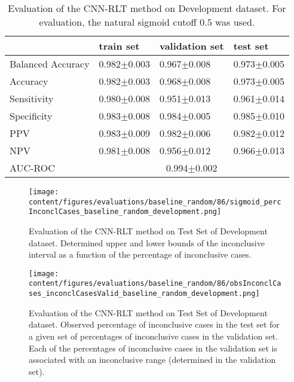 \begin{table}[ht]
  \caption{Evaluation of the CNN-RLT method on Development dataset. 
  For evaluation, the natural sigmoid cutoff $0.5$ was used.}
  \centering
  \begin{tabular}{llll}
      \hline
                        & train set         & validation set      & test set             \\
      \hline
      Balanced Accuracy & 0.982$\pm$0.003   &  0.967$\pm$0.008    &  0.973$\pm$0.005  \\
      Accuracy          & 0.982$\pm$0.003    &   0.968$\pm$0.008   &  0.973$\pm$0.005  \\
      Sensitivity       &  0.980$\pm$0.008  &   0.951$\pm$0.013  &  0.961$\pm$0.014 \\
      Specificity       &   0.983$\pm$0.008   &   0.984$\pm$0.005  &   0.985$\pm$0.010 \\
      PPV               &  0.983$\pm$0.009   &   0.982$\pm$0.006   &  0.982$\pm$0.012   \\
      NPV               &  0.981$\pm$0.008   &   0.956$\pm$0.012   & 0.966$\pm$0.013  \\
      \hline
      AUC-ROC          &  \multicolumn{3}{c}{0.994$\pm$0.002}  \\
      \hline
  \end{tabular}
 \label{t1:cnn_rlt_perf_eval_table}
\end{table}


\begin{figure}[t]
  \centering
  \texttt{[image: content/figures/evaluations/baseline\_random/86/sigmoid\_percInconclCases\_baseline\_random\_development.png]}
  \caption{Evaluation of the CNN-RLT method on Test Set of Development dataset. 
  Determined upper and lower bounds of the inconclusive interval as a function of the percentage of inconclusive cases.} 
  \label{fig:baseline_random_percInconclCases_development}
\end{figure}


\begin{figure}[h]
  \centering
  \texttt{[image: content/figures/evaluations/baseline\_random/86/obsInconclCases\_inconclCasesValid\_baseline\_random\_development.png]}
  \caption{Evaluation of the CNN-RLT method on Test Set of Development dataset.
  Observed percentage of inconclusive cases in the test set 
  for a given set of percentages of inconclusive cases in the validation set.
  Each of the percentages of inconclusive cases in the validation set is associated 
  with an inconclusive range (determined in the validation set).} 
  \label{fig:obsInconclCases_inconclCasesValid_baseline_random_development}
\end{figure} 


